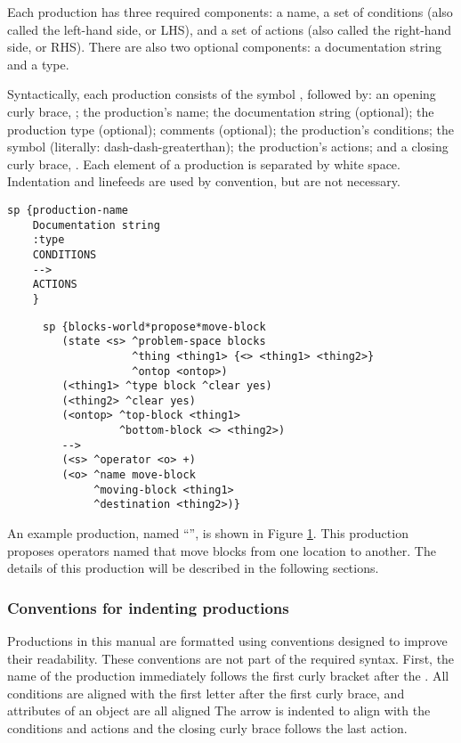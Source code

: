 Each production has three required components: a name, a set of conditions
(also called the left-hand side, or LHS), and a set of actions (also called the
right-hand side, or RHS).  There are also two optional components: a 
documentation string and a type.

Syntactically, each production consists of the symbol , followed
by: an opening curly brace, \soar{\{}; the production's name; the
documentation string (optional); the production type (optional);
comments (optional); the production's conditions; the symbol \soar{-->}
(literally: dash-dash-greaterthan); the production's actions; and a
closing curly brace, \soar{\}}.  Each element of a production is
separated by white space. Indentation and linefeeds are used by
convention, but are not necessary.

\begin{verbatim}
sp {production-name
    Documentation string
    :type
    CONDITIONS
    -->
    ACTIONS
    }
\end{verbatim}  \vspace{12pt}

\begin{figure}
\begin{verbatim}
sp {blocks-world*propose*move-block
   (state <s> ^problem-space blocks
              ^thing <thing1> {<> <thing1> <thing2>}
              ^ontop <ontop>)
   (<thing1> ^type block ^clear yes)
   (<thing2> ^clear yes)
   (<ontop> ^top-block <thing1>
            ^bottom-block <> <thing2>)
   -->
   (<s> ^operator <o> +)
   (<o> ^name move-block 
        ^moving-block <thing1> 
        ^destination <thing2>)}
\end{verbatim}
\label{fig:ex-prod}
\end{figure}

An example production, named ``'', is
shown in Figure \ref{fig:ex-prod}. This production proposes operators named 
 that move blocks
from one location to another. The details of this production will be described
in the following sections.

\subsubsection*{Conventions for indenting productions}

Productions in this manual are formatted using conventions designed to
improve their readability. These conventions are not part of the
required syntax. First, the name of the production immediately follows
the first curly bracket after the .  All conditions are aligned
with the first letter after the first curly brace, and attributes of an
object are all aligned The arrow is indented to align with the
conditions and actions and the closing curly brace follows the last
action.

